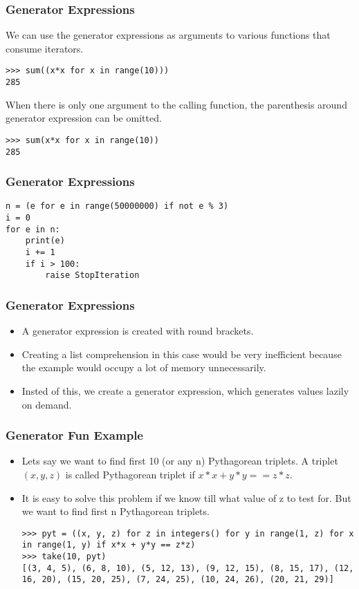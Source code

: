 \begin{frame}[fragile]\frametitle{Generator Expressions}
We can use the generator expressions as arguments to various functions that consume iterators.
\begin{lstlisting}
>>> sum((x*x for x in range(10)))
285
\end{lstlisting}
When there is only one argument to the calling function, the parenthesis around generator expression can be omitted.
\begin{lstlisting}
>>> sum(x*x for x in range(10))
285
\end{lstlisting}
\end{frame}

\begin{frame}[fragile]\frametitle{Generator Expressions}
\begin{lstlisting}
n = (e for e in range(50000000) if not e % 3)
i = 0
for e in n:
    print(e)
    i += 1
    if i > 100:
        raise StopIteration
\end{lstlisting}
\end{frame}


\begin{frame}[fragile]\frametitle{Generator Expressions}

    \begin{itemize}
    \item  A generator expression is created with round brackets. 
    \item Creating a list comprehension in this case would be very inefficient because the example would occupy a lot of memory unnecessarily.
    \item Insted of this, we create a generator expression, which generates values lazily on demand. 
    \end{itemize}
\end{frame}



\begin{frame}[fragile]\frametitle{Generator Fun Example}

    \begin{itemize}
    \item  Lets say we want to find first 10 (or any n) Pythagorean triplets. A triplet $(x, y, z)$ is called Pythagorean triplet if $x*x + y*y == z*z$.
\item It is easy to solve this problem if we know till what value of z to test for. But we want to find first n Pythagorean triplets.
\begin{lstlisting}
>>> pyt = ((x, y, z) for z in integers() for y in range(1, z) for x in range(1, y) if x*x + y*y == z*z)
>>> take(10, pyt)
[(3, 4, 5), (6, 8, 10), (5, 12, 13), (9, 12, 15), (8, 15, 17), (12, 16, 20), (15, 20, 25), (7, 24, 25), (10, 24, 26), (20, 21, 29)]
\end{lstlisting}
    \end{itemize}
\end{frame}

